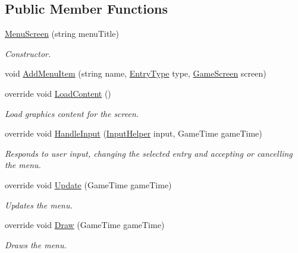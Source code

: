 \subsection*{Public Member Functions}
\begin{DoxyCompactItemize}
\item 
\hyperlink{classgearit_1_1xna_1_1_menu_screen_af02d8ae719c2a96d9177b55bfc4037da}{Menu\+Screen} (string menu\+Title)
\begin{DoxyCompactList}\small\item\em Constructor. \end{DoxyCompactList}\item 
void \hyperlink{classgearit_1_1xna_1_1_menu_screen_a59f14a74cafd089680c6a532e0a483be}{Add\+Menu\+Item} (string name, \hyperlink{namespacegearit_1_1xna_abf541ce7c750f327a7606b3c4fbce023}{Entry\+Type} type, \hyperlink{classgearit_1_1xna_1_1_game_screen}{Game\+Screen} screen)
\item 
override void \hyperlink{classgearit_1_1xna_1_1_menu_screen_ad7337ad9f9fb8864843a29d2d1292493}{Load\+Content} ()
\begin{DoxyCompactList}\small\item\em Load graphics content for the screen. \end{DoxyCompactList}\item 
override void \hyperlink{classgearit_1_1xna_1_1_menu_screen_a996a8adf13061ec92b181f26100fa295}{Handle\+Input} (\hyperlink{classgearit_1_1xna_1_1_input_helper}{Input\+Helper} input, Game\+Time game\+Time)
\begin{DoxyCompactList}\small\item\em Responds to user input, changing the selected entry and accepting or cancelling the menu. \end{DoxyCompactList}\item 
override void \hyperlink{classgearit_1_1xna_1_1_menu_screen_a78aa31f7ab98c7ece516891a3bb2ead5}{Update} (Game\+Time game\+Time)
\begin{DoxyCompactList}\small\item\em Updates the menu. \end{DoxyCompactList}\item 
override void \hyperlink{classgearit_1_1xna_1_1_menu_screen_ae97daa22f51bce0a1a8de63da28eace1}{Draw} (Game\+Time game\+Time)
\begin{DoxyCompactList}\small\item\em Draws the menu. \end{DoxyCompactList}\end{DoxyCompactItemize}
